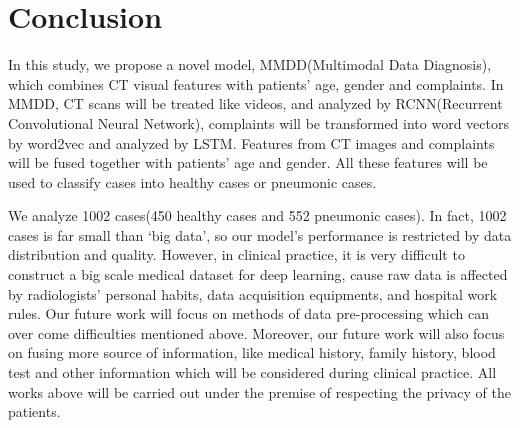 \documentclass[journal]{IEEEtran}
\begin{document}




\section{Conclusion}
\label{conclude}
In this study, we propose a novel model, MMDD(Multimodal Data Diagnosis), which combines CT visual features with patients' age, gender and complaints. In MMDD, CT scans will be treated like videos, and analyzed by RCNN(Recurrent Convolutional Neural Network), complaints will be transformed into word vectors by word2vec and analyzed by LSTM. Features from CT images and complaints will be fused together with patients' age and gender. All these features will be used to classify cases into healthy cases or pneumonic cases.

We analyze 1002 cases(450 healthy cases and 552 pneumonic cases). In fact, 1002 cases is far small than `big data', so our model's performance is restricted by data distribution and quality. However, in clinical practice, it is very difficult to construct a big scale medical dataset for deep learning, cause raw data is affected by radiologists' personal habits, data acquisition equipments, and hospital work rules. Our future work will focus on methods of data pre-processing which can over come difficulties mentioned above.
Moreover, our future work will also focus on fusing more source of information, like medical history, family history, blood test and other information which will be considered during clinical practice. All works above will be carried out under the premise of respecting the privacy of the patients.
 




\end{document}
